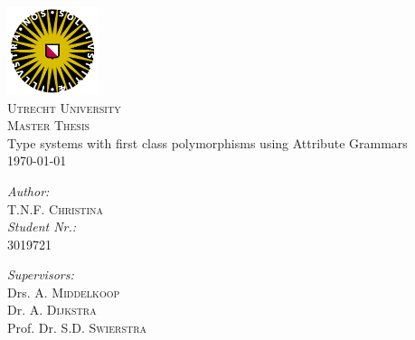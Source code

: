 \begin{titlepage}
 
\begin{center}
 

 \includegraphics[width=0.20\textwidth]{./uu_logo}\\[1cm] 

\textsc{\LARGE Utrecht University}\\[1.5cm]
 
\textsc{\Large Master Thesis}\\[0.5cm]
 

 { \huge  Type systems with first class polymorphisms using Attribute Grammars}\\[0.4cm]
 

\vfill
 {\large \today}

\vfill
\vfill 
 
 \begin{minipage}{0.4\textwidth}
 \begin{flushleft} \large
 \emph{Author:}\\
 T.N.F. \textsc{Christina} \\
 \emph{Student Nr.:} \\
 3019721
 \end{flushleft}
 \end{minipage}
 \begin{minipage}{0.5\textwidth}
 \begin{flushright} \large
 \emph{Supervisors:} \\
 Drs. A. \textsc{Middelkoop} \\
 Dr. A. \textsc{Dijkstra} \\
 Prof. Dr. S.D. \textsc{Swierstra}
 \end{flushright}
 \end{minipage}
 
\end{center}
 
\end{titlepage}
